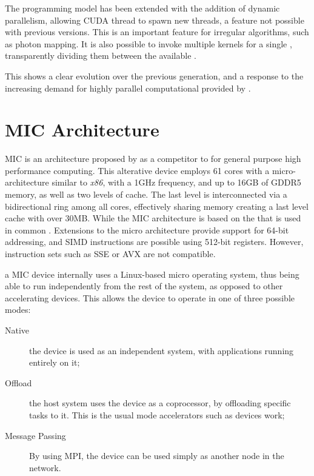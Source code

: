 \documentclass[main.tex]{subfiles}
\begin{document}

The programming model has been extended with the addition of dynamic parallelism, allowing \acs{CUDA} thread to spawn new threads, a feature not possible with previous versions. This is an important feature for irregular algorithms, such as photon mapping. It is also possible to invoke multiple kernels for a single \gpu, transparently dividing them between the available \smxs.

This shows a clear evolution over the previous generation, and a response to the increasing demand for highly parallel computational provided by \gpus.


\section{MIC Architecture}

\acf{MIC} \cite{Intel:MIC:QuickStartGuide} is an architecture proposed by \intel as a competitor to \gpus for general purpose high performance computing. This alterative device employs 61 cores with a micro-architecture similar to \textit{x86}, with a 1GHz frequency, and up to 16GB of GDDR5 memory, as well as two levels of cache. The last level is interconnected via a bidirectional ring among all cores, effectively sharing memory creating a last level cache with over 30MB.
While the \acs{MIC} architecture is based on the  that is used in common \cpus. Extensions to the micro architecture provide support for 64-bit addressing, and SIMD instructions are possible using 512-bit registers. However, instruction sets such as \acf{SSE} or \acf{AVX} are not compatible.

a \acs{MIC} device internally uses a Linux-based micro operating system, thus being able to run independently from the rest of the system, as opposed to other accelerating devices. This allows the device to operate in one of three possible modes:
\begin{description}
\item[Native] the device is used as an independent system, with applications running entirely on it;
\item[Offload] the host system uses the device as a coprocessor, by offloading specific tasks to it. This is the usual mode accelerators such as \cuda devices work;
\item[Message Passing] By using \acs{MPI}, the device can be used simply as another node in the network.
\end{description}
\end{document}

